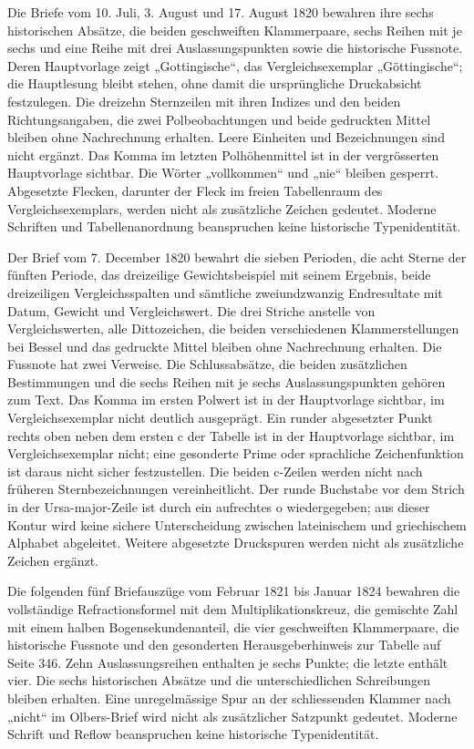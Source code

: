 Die Briefe vom 10. Juli, 3. August und 17. August 1820 bewahren ihre sechs historischen Absätze, die beiden geschweiften Klammerpaare, sechs Reihen mit je sechs und eine Reihe mit drei Auslassungspunkten sowie die historische Fussnote. Deren Hauptvorlage zeigt „Gottingische“, das Vergleichsexemplar „Göttingische“; die Hauptlesung bleibt stehen, ohne damit die ursprüngliche Druckabsicht festzulegen. Die dreizehn Sternzeilen mit ihren Indizes und den beiden Richtungsangaben, die zwei Polbeobachtungen und beide gedruckten Mittel bleiben ohne Nachrechnung erhalten. Leere Einheiten und Bezeichnungen sind nicht ergänzt. Das Komma im letzten Polhöhenmittel ist in der vergrösserten Hauptvorlage sichtbar. Die Wörter „vollkommen“ und „nie“ bleiben gesperrt. Abgesetzte Flecken, darunter der Fleck im freien Tabellenraum des Vergleichsexemplars, werden nicht als zusätzliche Zeichen gedeutet. Moderne Schriften und Tabellenanordnung beanspruchen keine historische Typenidentität.

Der Brief vom 7. December 1820 bewahrt die sieben Perioden, die acht Sterne der fünften Periode, das dreizeilige Gewichtsbeispiel mit seinem Ergebnis, beide dreizeiligen Vergleichsspalten und sämtliche zweiundzwanzig Endresultate mit Datum, Gewicht und Vergleichswert. Die drei Striche anstelle von Vergleichswerten, alle Dittozeichen, die beiden verschiedenen Klammerstellungen bei Bessel und das gedruckte Mittel bleiben ohne Nachrechnung erhalten. Die Fussnote hat zwei Verweise. Die Schlussabsätze, die beiden zusätzlichen Bestimmungen und die sechs Reihen mit je sechs Auslassungspunkten gehören zum Text. Das Komma im ersten Polwert ist in der Hauptvorlage sichtbar, im Vergleichsexemplar nicht deutlich ausgeprägt. Ein runder abgesetzter Punkt rechts oben neben dem ersten c der Tabelle ist in der Hauptvorlage sichtbar, im Vergleichsexemplar nicht; eine gesonderte Prime oder sprachliche Zeichenfunktion ist daraus nicht sicher festzustellen. Die beiden c-Zeilen werden nicht nach früheren Sternbezeichnungen vereinheitlicht. Der runde Buchstabe vor dem Strich in der Ursa-major-Zeile ist durch ein aufrechtes o wiedergegeben; aus dieser Kontur wird keine sichere Unterscheidung zwischen lateinischem und griechischem Alphabet abgeleitet. Weitere abgesetzte Druckspuren werden nicht als zusätzliche Zeichen ergänzt.

Die folgenden fünf Briefauszüge vom Februar 1821 bis Januar 1824 bewahren die vollständige Refractionsformel mit dem Multiplikationskreuz, die gemischte Zahl mit einem halben Bogensekundenanteil, die vier geschweiften Klammerpaare, die historische Fussnote und den gesonderten Herausgeberhinweis zur Tabelle auf Seite 346. Zehn Auslassungsreihen enthalten je sechs Punkte; die letzte enthält vier. Die sechs historischen Absätze und die unterschiedlichen Schreibungen bleiben erhalten. Eine unregelmässige Spur an der schliessenden Klammer nach „nicht“ im Olbers-Brief wird nicht als zusätzlicher Satzpunkt gedeutet. Moderne Schrift und Reflow beanspruchen keine historische Typenidentität.

